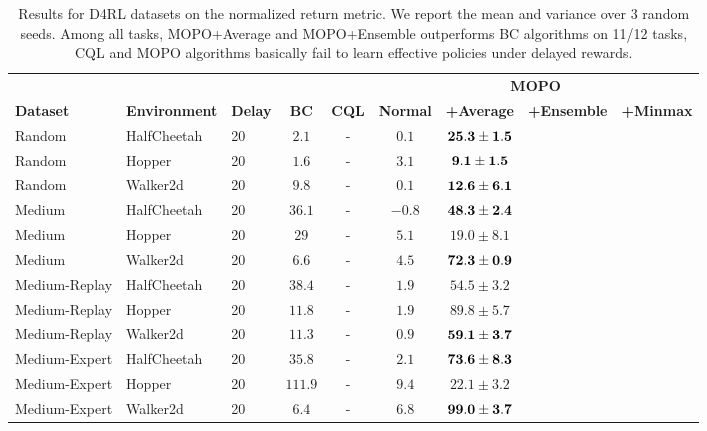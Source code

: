 \begin{table}[h]
\centering
\begin{tabular}{lll|cc|cccc}
\toprule
& & & & & \multicolumn{4}{c}{\bf MOPO} \\
\multicolumn{1}{l}{\bf Dataset} & \multicolumn{1}{c}{\bf Environment} & \multicolumn{1}{c|}{\bf Delay} & \multicolumn{1}{c}{\bf BC} & \multicolumn{1}{c|}{\bf CQL} & \multicolumn{1}{c}{\bf{Normal}} & \multicolumn{1}{c}{\bf +Average} & \multicolumn{1}{c}{\bf +Ensemble} & \multicolumn{1}{c}{\bf +Minmax}\\
\midrule
Random        & HalfCheetah &  20 & $2.1$ &  -  &  $0.1$ &  $\bf{25.3 \pm 1.5 }$ \\
Random        & Hopper      &  20 & $1.6$ &  -  &  $3.1$ &  $\bf{9.1 \pm 1.5 }$ \\
Random        & Walker2d    &  20 & $9.8$ &  -  &  $0.1$ &  $\bf{12.6 \pm 6.1 }$ \\
\midrule
Medium        & HalfCheetah &  20 & $36.1$ &  - &  $-0.8$ &  $\bf{48.3 \pm 2.4}$ \\
Medium        & Hopper      &  20 & $29$ & - & $5.1$ &  $19.0 \pm 8.1$ \\
Medium        & Walker2d    &  20 & $6.6$ & - & $4.5$ &  $\bf{72.3 \pm 0.9}$ \\
\midrule
Medium-Replay & HalfCheetah &  20 & $38.4$ & - & $1.9$ &  $54.5 \pm 3.2$ \\
Medium-Replay & Hopper      &  20 & $11.8$ & - & $1.9$ &  $89.8 \pm 5.7$ \\
Medium-Replay & Walker2d    &  20 & $11.3$ & - & $0.9$ &  $\bf{59.1 \pm 3.7}$ \\
\midrule
Medium-Expert & HalfCheetah &  20 & $35.8$ & - & $2.1$ &  $\bf{73.6 \pm 8.3}$ \\
Medium-Expert & Hopper      &  20 & $111.9$ & - & $9.4$ &  $22.1 \pm 3.2$ \\
Medium-Expert & Walker2d    &  20 & $6.4$  & - & $6.8$ & $\bf{99.0 \pm 3.7}$\\
\bottomrule
\end{tabular}
\caption{
Results for D4RL datasets on the normalized return metric. We report the mean 
and variance over 3 random seeds. Among all tasks, MOPO+Average and MOPO+Ensemble outperforms BC 
algorithms on 11/12 tasks, CQL and MOPO algorithms basically fail to learn effective policies 
under delayed rewards.}
\label{tbl:mujoco_results}
\end{table}

